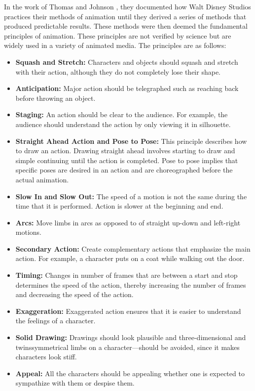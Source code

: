 In the work of Thomas and Johnson \cite{thomas_disney_1981}, they documented how Walt Disney Studios practices their methods of animation until they derived a series of methods that produced predictable results. These methods were then deemed the fundamental principles of animation. These principles are not verified by science but are widely used in a variety of animated media. The principles are as follows: 
\begin{itemize}
    \item \textbf{Squash and Stretch:} Characters and objects should squash and stretch with their action, although they do not completely lose their shape. 
    \item \textbf{Anticipation:} Major action should be telegraphed such as reaching back before throwing an object. 
    \item \textbf{Staging:} An action should be clear to the audience. For example, the audience should understand the action by only viewing it in silhouette.
    \item \textbf{Straight Ahead Action and Pose to Pose:} This principle describes how to draw an action. Drawing straight ahead involves starting to draw and simple continuing until the action is completed. Pose to pose implies that specific poses are desired in an action and are choreographed before the actual animation.
    \item \textbf{Slow In and Slow Out:} The speed of a motion is not the same during the time that it is performed. Action is slower at the beginning and end. 
    \item \textbf{Arcs:} Move limbs in arcs as opposed to of straight up-down and left-right motions. 
    \item \textbf{Secondary Action:} Create complementary actions that emphasize the main action. For example, a character puts on a coat while walking out the door. 
    \item \textbf{Timing:} Changes in number of frames that are between a start and stop determines the speed of the action, thereby increasing the number of frames and decreasing the speed of the action. 
    \item \textbf{Exaggeration:} Exaggerated action ensures that it is easier to understand the feelings of a character. 
    \item \textbf{Solid Drawing:} Drawings should look plausible and three-dimensional and twinssymmetrical limbs on a character—should be avoided, since it makes characters look stiff.
    \item \textbf{Appeal:} All the characters should be appealing whether one is expected to sympathize with them or despise them. 
\end{itemize}

